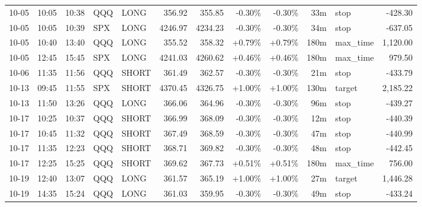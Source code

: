 \documentclass[11pt,a4paper,twoside]{article}
\begin{document}
\begin{center}
\begin{longtable}{>{\color{txtmain}}l l l l l r r r r r >{\color{txtmain}}l r}
10-05 & 10:05 & 10:38 & QQQ & LONG & 356.92 & 355.85 & \textcolor{lossred}{-0.30\%} & \textcolor{lossred}{-0.30\%} & 33m & stop & \textcolor{lossred}{-428.30} \\
10-05 & 10:05 & 10:39 & SPX & LONG & 4246.97 & 4234.23 & \textcolor{lossred}{-0.30\%} & \textcolor{lossred}{-0.30\%} & 34m & stop & \textcolor{lossred}{-637.05} \\
10-05 & 10:40 & 13:40 & QQQ & LONG & 355.52 & 358.32 & \textcolor{wingreen}{+0.79\%} & \textcolor{wingreen}{+0.79\%} & 180m & max\_time & \textcolor{wingreen}{1,120.00} \\
10-05 & 12:45 & 15:45 & SPX & LONG & 4241.03 & 4260.62 & \textcolor{wingreen}{+0.46\%} & \textcolor{wingreen}{+0.46\%} & 180m & max\_time & \textcolor{wingreen}{979.50} \\
10-06 & 11:35 & 11:56 & QQQ & SHORT & 361.49 & 362.57 & \textcolor{lossred}{-0.30\%} & \textcolor{lossred}{-0.30\%} & 21m & stop & \textcolor{lossred}{-433.79} \\
10-13 & 09:45 & 11:55 & SPX & SHORT & 4370.45 & 4326.75 & \textcolor{wingreen}{+1.00\%} & \textcolor{wingreen}{+1.00\%} & 130m & target & \textcolor{wingreen}{2,185.22} \\
10-13 & 11:50 & 13:26 & QQQ & LONG & 366.06 & 364.96 & \textcolor{lossred}{-0.30\%} & \textcolor{lossred}{-0.30\%} & 96m & stop & \textcolor{lossred}{-439.27} \\
10-17 & 10:25 & 10:37 & QQQ & SHORT & 366.99 & 368.09 & \textcolor{lossred}{-0.30\%} & \textcolor{lossred}{-0.30\%} & 12m & stop & \textcolor{lossred}{-440.39} \\
10-17 & 10:45 & 11:32 & QQQ & SHORT & 367.49 & 368.59 & \textcolor{lossred}{-0.30\%} & \textcolor{lossred}{-0.30\%} & 47m & stop & \textcolor{lossred}{-440.99} \\
10-17 & 11:35 & 12:23 & QQQ & SHORT & 368.71 & 369.82 & \textcolor{lossred}{-0.30\%} & \textcolor{lossred}{-0.30\%} & 48m & stop & \textcolor{lossred}{-442.45} \\
10-17 & 12:25 & 15:25 & QQQ & SHORT & 369.62 & 367.73 & \textcolor{wingreen}{+0.51\%} & \textcolor{wingreen}{+0.51\%} & 180m & max\_time & \textcolor{wingreen}{756.00} \\
10-19 & 12:40 & 13:07 & QQQ & LONG & 361.57 & 365.19 & \textcolor{wingreen}{+1.00\%} & \textcolor{wingreen}{+1.00\%} & 27m & target & \textcolor{wingreen}{1,446.28} \\
10-19 & 14:35 & 15:24 & QQQ & LONG & 361.03 & 359.95 & \textcolor{lossred}{-0.30\%} & \textcolor{lossred}{-0.30\%} & 49m & stop & \textcolor{lossred}{-433.24} \\

\end{longtable}
\end{center}
\end{document}

